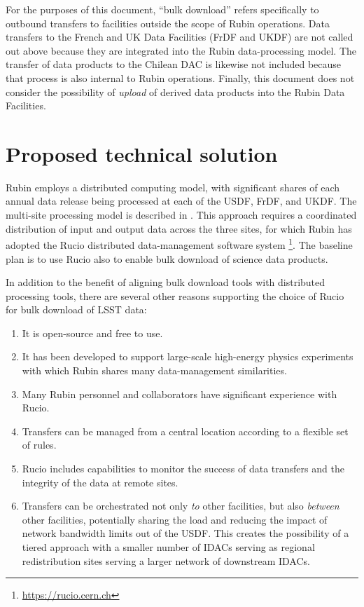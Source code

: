 For the purposes of this document, ``bulk download'' refers specifically to outbound transfers to facilities outside the scope of Rubin operations. Data transfers to the French and UK Data Facilities (FrDF and UKDF) are not called out above because they are integrated into the Rubin data-processing model. The transfer of data products to the Chilean DAC is likewise not included because that process is also internal to Rubin operations. Finally, this document does not consider the possibility of \textit{upload} of derived data products into the Rubin Data Facilities.

\section{Proposed technical solution}

Rubin employs a distributed computing model, with significant shares of each annual data release being processed at each of the USDF, FrDF, and UKDF. The multi-site processing model is described in . This approach requires a coordinated distribution of input and output data across the three sites, for which Rubin has adopted the Rucio distributed data-management software system \citep{Barisits2019} \footnote{\url{https://rucio.cern.ch}}. The baseline plan is to use Rucio also to enable bulk download of science data products.

In addition to the benefit of aligning bulk download tools with distributed processing tools, there are several other reasons supporting the choice of Rucio for bulk download of LSST data:
\begin{enumerate}
\item It is open-source and free to use.
\item It has been developed to support large-scale high-energy physics experiments with which Rubin shares many data-management similarities.
\item Many Rubin personnel and collaborators have significant experience with Rucio. 
\item Transfers can be managed from a central location according to a flexible set of rules.
\item Rucio includes capabilities to monitor the success of data transfers and the integrity of the data at remote sites.
\item Transfers can be orchestrated not only \textit{to} other facilities, but also \textit{between} other facilities, potentially sharing the load and reducing the impact of network bandwidth limits out of the USDF. This creates the possibility of a tiered approach with a smaller number of IDACs serving as regional redistribution sites serving a larger network of downstream IDACs.
\end{enumerate}

